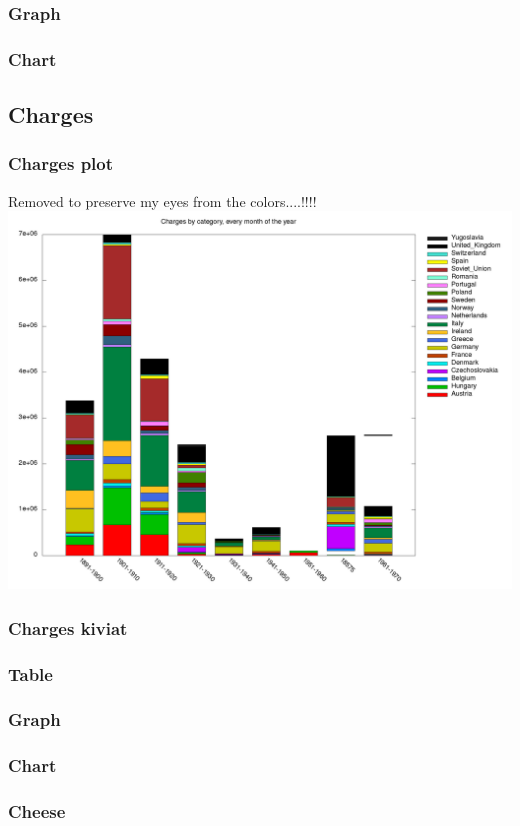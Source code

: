 \documentclass[8pt]{article} %
\begin{document}
\subsubsection{Graph}

\subsubsection{Chart}


\subsection{Charges}


\subsubsection{Charges plot}
Removed to preserve my eyes from the colors....!!!!\\
\includegraphics[scale=0.3]{Charges2.png}

\subsubsection{Charges kiviat}


\subsubsection{Table}


\subsubsection{Graph}


\subsubsection{Chart}

\subsubsection{Cheese}


\end{document}
